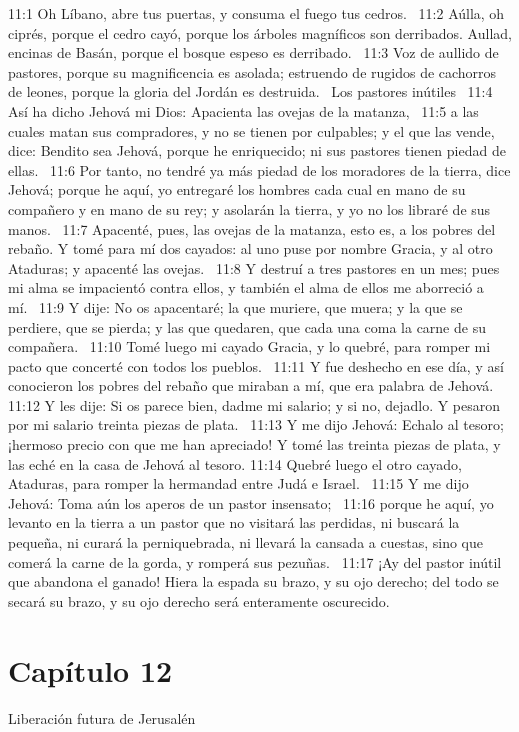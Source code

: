 11:1 Oh Líbano, abre tus puertas, y consuma el fuego tus cedros.  
11:2 Aúlla, oh ciprés, porque el cedro cayó, porque los árboles magníficos son derribados. Aullad, encinas de Basán, porque el bosque espeso es derribado.  
11:3 Voz de aullido de pastores, porque su magnificencia es asolada; estruendo de rugidos de cachorros de leones, porque la gloria del Jordán es destruida.  
Los pastores inútiles  
11:4 Así ha dicho Jehová mi Dios: Apacienta las ovejas de la matanza,  
11:5 a las cuales matan sus compradores, y no se tienen por culpables; y el que las vende, dice: Bendito sea Jehová, porque he enriquecido; ni sus pastores tienen piedad de ellas.  
11:6 Por tanto, no tendré ya más piedad de los moradores de la tierra, dice Jehová; porque he aquí, yo entregaré los hombres cada cual en mano de su compañero y en mano de su rey; y asolarán la tierra, y yo no los libraré de sus manos.  
11:7 Apacenté, pues, las ovejas de la matanza, esto es, a los pobres del rebaño. Y tomé para mí dos cayados: al uno puse por nombre Gracia, y al otro Ataduras; y apacenté las ovejas.  
11:8 Y destruí a tres pastores en un mes; pues mi alma se impacientó contra ellos, y también el alma de ellos me aborreció a mí.  
11:9 Y dije: No os apacentaré; la que muriere, que muera; y la que se perdiere, que se pierda; y las que quedaren, que cada una coma la carne de su compañera.  
11:10 Tomé luego mi cayado Gracia, y lo quebré, para romper mi pacto que concerté con todos los pueblos.  
11:11 Y fue deshecho en ese día, y así conocieron los pobres del rebaño que miraban a mí, que era palabra de Jehová.  
11:12 Y les dije: Si os parece bien, dadme mi salario; y si no, dejadlo. Y pesaron por mi salario treinta piezas de plata.  
11:13 Y me dijo Jehová: Echalo al tesoro; ¡hermoso precio con que me han apreciado! Y tomé las treinta piezas de plata, y las eché en la casa de Jehová al tesoro. 
11:14 Quebré luego el otro cayado, Ataduras, para romper la hermandad entre Judá e Israel.  
11:15 Y me dijo Jehová: Toma aún los aperos de un pastor insensato;  
11:16 porque he aquí, yo levanto en la tierra a un pastor que no visitará las perdidas, ni buscará la pequeña, ni curará la perniquebrada, ni llevará la cansada a cuestas, sino que comerá la carne de la gorda, y romperá sus pezuñas.  
11:17 ¡Ay del pastor inútil que abandona el ganado! Hiera la espada su brazo, y su ojo derecho; del todo se secará su brazo, y su ojo derecho será enteramente oscurecido.  
\section*{Capítulo 12 }
Liberación futura de Jerusalén  

